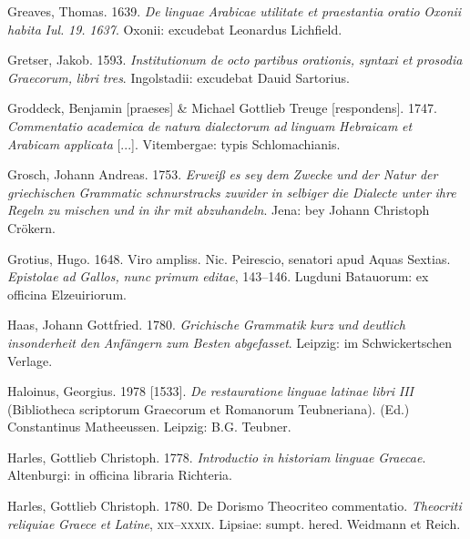 Greaves, Thomas. 1639. \textit{De} \textit{linguae} \textit{Arabicae} \textit{utilitate} \textit{et} \textit{praestantia} \textit{oratio} \textit{Oxonii} \textit{habita} \textit{Iul.} \textit{19.} \textit{1637}. Oxonii: excudebat Leonardus Lichfield.

Gretser, Jakob. 1593. \textit{Institutionum} \textit{de} \textit{octo} \textit{partibus} \textit{orationis,} \textit{syntaxi} \textit{et} \textit{prosodia} \textit{Graecorum,} \textit{libri} \textit{tres}. Ingolstadii: excudebat Dauid Sartorius.

Groddeck, Benjamin [praeses] \& Michael Gottlieb Treuge [respondens]. 1747. \textit{Commentatio} \textit{academica} \textit{de} \textit{natura} \textit{dialectorum} \textit{ad} \textit{linguam} \textit{Hebraicam} \textit{et} \textit{Arabicam} \textit{applicata} [...]. Vitembergae: typis Schlomachianis.

Grosch, Johann Andreas. 1753. \textit{Erweiß} \textit{es} \textit{sey} \textit{dem} \textit{Zwecke} \textit{und} \textit{der} \textit{Natur} \textit{der} \textit{griechischen} \textit{Grammatic} \textit{schnurstracks} \textit{zuwider} \textit{in} \textit{selbiger} \textit{die} \textit{Dialecte} \textit{unter} \textit{ihre} \textit{Regeln} \textit{zu} \textit{mischen} \textit{und} \textit{in} \textit{ihr} \textit{mit} \textit{abzuhandeln}. Jena: bey Johann Christoph Crökern.

Grotius, Hugo. 1648. Viro ampliss. Nic. Peirescio, senatori apud Aquas Sextias. \textit{Epistolae} \textit{ad} \textit{Gallos,} \textit{nunc} \textit{primum} \textit{editae}, 143–146. Lugduni Batauorum: ex officina Elzeuiriorum.

Haas, Johann Gottfried. 1780. \textit{Grichische} \textit{Grammatik} \textit{kurz} \textit{und} \textit{deutlich} \textit{insonderheit} \textit{den} \textit{Anfängern} \textit{zum} \textit{Besten} \textit{abgefasset}. Leipzig: im Schwickertschen Verlage.

Haloinus, Georgius. 1978 [1533]. \textit{De} \textit{restauratione} \textit{linguae} \textit{latinae} \textit{libri} \textit{III} (Bibliotheca scriptorum Graecorum et Romanorum Teubneriana). (Ed.) Constantinus Matheeussen. Leipzig: B.G. Teubner.

Harles, Gottlieb Christoph. 1778. \textit{Introductio} \textit{in} \textit{historiam} \textit{linguae} \textit{Graecae}. Altenburgi: in officina libraria Richteria.

Harles, Gottlieb Christoph. 1780. De Dorismo Theocriteo commentatio. \textit{Theocriti} \textit{reliquiae} \textit{Graece} \textit{et} \textit{Latine}, \textsc{xix}–\textsc{xxxix}. Lipsiae: sumpt. hered. Weidmann et Reich.

